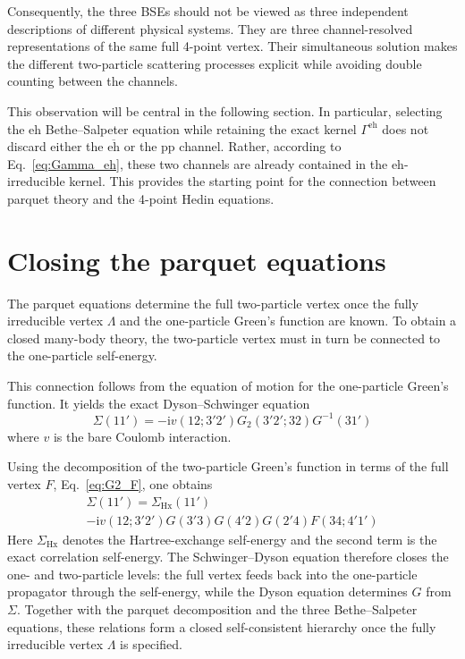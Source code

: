 \documentclass[aip,jcp,reprint,noshowkeys,superscriptaddress]{revtex4-1}
\newcommand{\ii}{\mathrm{i}}
\newcommand{\eh}{\text{eh}}
\newcommand{\teh}{\overline{\text{eh}}}
\newcommand{\pp}{\text{pp}}
\newcommand{\Hx}{\text{Hx}}
\begin{document}
Consequently, the three BSEs should not be viewed as three independent
descriptions of different physical systems.
They are three channel-resolved representations of the same full
4-point vertex.
Their simultaneous solution makes the different two-particle scattering
processes explicit while avoiding double counting between the channels.

This observation will be central in the following section.
In particular, selecting the $\eh$ Bethe--Salpeter equation while retaining
the exact kernel $\Gamma^\eh$ does not discard either the
$\teh$ or the $\pp$ channel.
Rather, according to Eq.~\eqref{eq:Gamma_eh}, these two channels are
already contained in the $\eh$-irreducible kernel.
This provides the starting point for the connection between parquet theory
and the 4-point Hedin equations.\cite{StarkeKresse2012,OrlandoRomanielloLoos2023}

\section{Closing the parquet equations}
\label{sec:closing_parquet}

The parquet equations determine the full two-particle vertex once the
fully irreducible vertex $\Lambda$ and the one-particle Green's function
are known.
To obtain a closed many-body theory, the two-particle vertex must in turn
be connected to the one-particle self-energy.

This connection follows from the equation of motion for the one-particle
Green's function.\cite{MarieLoos2025}
It yields the exact Dyson--Schwinger equation
\begin{equation}
	\Sigma(11')
	=
	-\ii
	v(12;3'2')
	G_2(3'2';32)
	G^{-1}(31')
	\label{eq:SDE_G2}
\end{equation}
where $v$ is the bare Coulomb interaction.

Using the decomposition of the two-particle Green's function in terms of
the full vertex $F$, Eq.~\eqref{eq:G2_F}, one obtains
\begin{multline}
	\Sigma(11')
	=
	\Sigma_{\Hx}(11')
	\\
	-
	\ii
	v(12;3'2')
	G(3'3)
	G(4'2)
	G(2'4)
	F(34;4'1')
	\label{eq:SDE_F}
\end{multline}
Here $\Sigma_{\Hx}$ denotes the Hartree-exchange self-energy and the
second term is the exact correlation self-energy.
The Schwinger--Dyson equation therefore closes the one- and two-particle
levels: the full vertex feeds back into the one-particle propagator through
the self-energy, while the Dyson equation determines $G$ from $\Sigma$.
Together with the parquet decomposition and the three Bethe--Salpeter
equations, these relations form a closed self-consistent hierarchy once
the fully irreducible vertex $\Lambda$ is specified.
\end{document}
